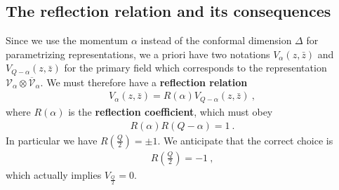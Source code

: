 \documentclass[12pt,a4paper,notitlepage]{report}
\numberwithin{equation}{section}
\theoremstyle{break}
\begin{document}
\subsection{The reflection relation and its consequences}

Since we
use the momentum $\alpha$ instead of the conformal dimension $\Delta$ for parametrizing representations, we a priori have two notations $V_\alpha(z,\bar{z})$ and $V_{Q-\alpha}(z,\bar{z})$ for the primary field which corresponds to the representation $\mathcal{V}_\alpha \otimes \overline{\mathcal{V}}_\alpha$.
We must therefore have a \textbf{\boldmath reflection relation}
\begin{align}
 \boxed{V_\alpha(z,\bar{z})= R(\alpha) V_{Q-\alpha}(z,\bar{z})}\ ,
\label{vrv}
\end{align}
where $R(\alpha)$ is the \textbf{\boldmath reflection coefficient}, which must obey 
\begin{align}
 R(\alpha)R(Q-\alpha)=1\ .
\label{rrr}
\end{align}
In particular we have $R(\frac{Q}{2})=\pm 1$.
We anticipate that the correct choice is 
\begin{align}
 R(\tfrac{Q}{2}) = -1\ ,
\label{rqt}
\end{align}
which actually implies $V_{\frac{Q}{2}}=0$. 
\end{document}
